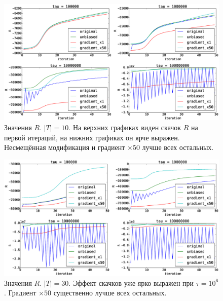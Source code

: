 \documentclass[utf8]{beamer}
\begin{document}
\begin{frame}
\begin{figure}[h]
	\centering   
	\caption{Значения $R$. $|T| = 10$.  На верхних графиках виден скачок $R$ на первой итераций, на нижних графиках он ярче выражен. Несмещённая модификация и градиент $\times 50$  лучше всех остальных.} 
	\medskip
	\includegraphics[width=0.9\linewidth]{presentation_pictures/topics_10_R_values.eps}  
\end{figure}
\end{frame}
	
\begin{frame}
\begin{figure}[h]
	\centering   
	\caption{Значения $R$. $|T| = 30$. Эффект скачков уже ярко выражен при $\tau = 10^6$. Градиент $\times 50$ существенно лучше всех остальных.} 
	\medskip
	\includegraphics[width=0.9\linewidth]{presentation_pictures/topics_30_R_values.eps}  
\end{figure}
\end{frame}
	
\end{document}
